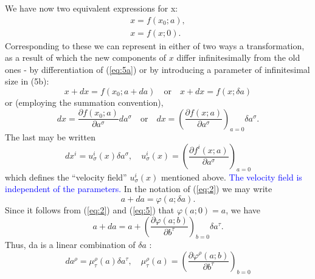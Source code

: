 We have now two equivalent expressions for x:
\begin{subequations}\label{eq:5}
  \begin{align}
x=f(x_0; a), \label{eq:5a} \\
x=f(x; 0).  \label{eq:5b}
  \end{align}
\end{subequations}
Corresponding to these we can represent in either of two ways a transformation,
as a result of which the new components of \(x\) differ infinitesimally from
the old ones - by differentiation of (\ref{eq:5a}) or by introducing a parameter
of infinitesimal size in (5b):
\[
x+d x=f\left(x_0 ; a+d a\right) \quad \text{or} \quad
x+d x=f\left(x; \delta a\right)
\]
or (employing the summation convention),
\begin{equation}\label{eq:6}
d x=\frac{\partial f\left(x_{0}; a\right)}{\partial a^\sigma} d{a}^\sigma
\quad \text{or} \quad
d x=\left(\frac{\partial f(x ; a)}{\partial a^\sigma}\right)_{a=0} \delta a^\sigma.
\end{equation}
The last may be written
\begin{equation}\label{eq:7}
d x^i=u_\sigma^i(x) \delta a^\sigma, \quad
u_\sigma^i(x)=\left(\frac{\partial f^i(x; a)}{\partial a^\sigma}\right)_{a=0}
\end{equation}
which defines the ``velocity field'' \(u_\sigma^i(x)\) mentioned above.
\textcolor{blue}{The velocity field is independent of the parameters.}
In the notation of (\ref{eq:2}) we may write
\[
a+d a=\varphi(a ; \delta a) .
\]
Since it follows from (\ref{eq:2}) and (\ref{eq:5}) that \(\varphi(a ; 0)=a\), we have
\[
a+d a=a+\left(\frac{\partial \varphi(a ; b)}{\partial b^\tau}\right)_{b=0} \delta a^\tau .
\]
Thus, da is a linear combination of \(\delta a\) :
\begin{equation}\label{eq:8}
d a^\rho=\mu_\tau^\rho(a) \delta a^\tau, \quad \mu_\tau^\rho(a)=
\left(\frac{\partial \varphi^\rho(a; b)}{\partial b^{\tau}}\right)_{b=0}
\end{equation}

